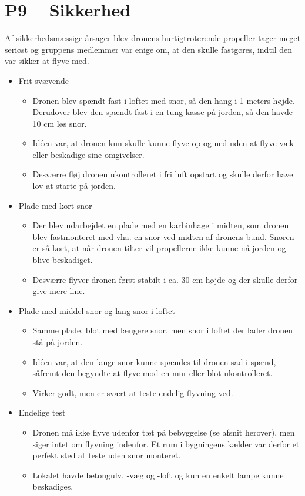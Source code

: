 \documentclass[Main]{subfiles}
\begin{document}
\section[Sikkerhed]{P9 -- Sikkerhed}
Af sikkerhedsmæssige årsager blev dronens hurtigtroterende propeller tager meget seriøst og gruppens medlemmer var enige om, at den skulle fastgøres, indtil den var sikker at flyve med.
\begin{itemize}
\item Frit svævende
	\begin{itemize}
	\item Dronen blev spændt fast i loftet med snor, så den hang i 1 meters højde. Derudover blev den spændt fast i en tung kasse på jorden, så den havde 10 cm løs snor. 
	\item Idéen var, at dronen kun skulle kunne flyve op og ned uden at flyve væk eller beskadige sine omgivelser.
	\item Desværre fløj dronen ukontrolleret i fri luft opstart og skulle derfor have lov at starte på jorden.
	\end{itemize}
	
\item Plade med kort snor
	\begin{itemize}
	\item Der blev udarbejdet en plade med en karbinhage i midten, som dronen blev fastmonteret med vha. en snor ved midten af dronens bund.
	Snoren er så kort, at når dronen tilter vil propellerne ikke kunne nå jorden og blive beskadiget.
	\item Desværre flyver dronen først stabilt i ca. 30 cm højde og der skulle derfor give mere line.
	\end{itemize}
	
\item Plade med middel snor og lang snor i loftet
	\begin{itemize}
	\item Samme plade, blot med længere snor, men snor i loftet der lader dronen stå på jorden.
	\item Idéen var, at den lange snor kunne spændes til dronen sad i spænd, såfremt den begyndte at flyve mod en mur eller blot ukontrolleret.
	\item Virker godt, men er svært at teste endelig flyvning ved.
	\end{itemize}

\item Endelige test
	\begin{itemize}
	\item Dronen må ikke flyve udenfor tæt på bebyggelse (se afsnit herover), men siger intet om flyvning indenfor. Et rum i bygningens kælder var derfor et perfekt sted at teste uden snor monteret.
	\item Lokalet havde betongulv, -væg og -loft og kun en enkelt lampe kunne beskadiges. 
	\end{itemize}
\end{itemize}
\end{document}
